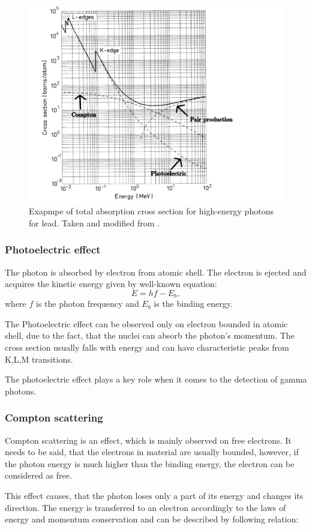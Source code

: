 \begin{figure}[H]
 \centering
 \includegraphics[scale=0.6, angle = 0]{./pictures/totalCross}
 \caption{Exapmpe of total absorption cross section for high-energy photons for lead. Taken and modified from \cite{Leo1987-wy}.}
 \label{cross}
 
\end{figure}
 


\subsubsection{Photoelectric effect}
The photon is absorbed by electron from atomic shell. The electron is ejected and acquires the kinetic energy given by well-known equation:
 \begin{equation}
 E = hf - E_{b},
 \end{equation}
where $f$ is the photon frequency and $E_{b}$ is the binding energy.
 
The Photoelectric effect can be observed only on electron bounded in atomic shell, due to the fact, that the nuclei can absorb the photon's momentum. The cross section usually falls with energy and can have characteristic peaks from K,L,M transitions.

\par

The photoelectric effect plays a key role when it comes to the detection of gamma photons.

\subsubsection{Compton scattering}
Compton scattering is an effect, which is mainly observed on free electrons. It needs to be said, that the electrons in material are usually bounded, however, if the photon energy is much higher than the binding energy, the electron can be considered as free.
\par
This effect causes, that the photon loses only a part of its energy and changes its direction. The energy is transferred to an electron accordingly to the laws of energy and momentum conservation and can be described by following relation:

